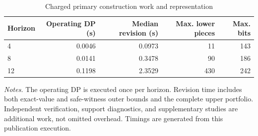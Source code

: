 \begin{table}[t]\centering\small\caption{Charged primary construction work and representation}\label{tab:work_summary}
\begin{tabular}{lrrrr}
\toprule
Horizon & Operating DP (s) & Median revision (s) & Max. lower pieces & Max. bits \\
\midrule
4 & 0.0046 & 0.0973 & 11 & 143 \\
8 & 0.0141 & 0.3478 & 90 & 186 \\
12 & 0.1198 & 2.3529 & 430 & 242 \\
\bottomrule\end{tabular}
\par\smallskip\begin{minipage}{\linewidth}\footnotesize\emph{Notes.} The operating DP is executed once per horizon. Revision time includes both exact-value and safe-witness outer bounds and the complete upper portfolio. Independent verification, support diagnostics, and supplementary studies are additional work, not omitted overhead. Timings are generated from this publication execution.\end{minipage}
\end{table}
